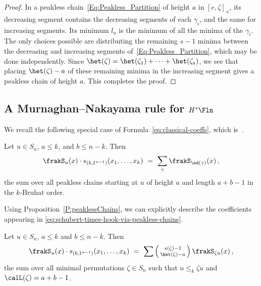 \begin{proof}
In a peakless chain~\eqref{Eq:Peakless_Partition} of height $a$ in $[e,\zeta]_\preceq$, its decreasing segment contains
the decreasing segments of each $\gamma_i$, and the same for increasing segments.
Its minimum $l_a$ is the minimum of all the minima of the $\gamma_i$.
The only choices possible are distributing the remaining $s{-}1$ minima between the decreasing and increasing segments
of~\eqref{Eq:Peakless_Partition}, which may be done independently.
Since $\het(\zeta)=\het(\zeta_1)+\dotsb+\het(\zeta_s)$, we see that placing $\het(\zeta)-a$ of these remaining minima in
the increasing segment gives a peakless chain of height $a$.
This completes the proof.
\end{proof}

\subsection{A Murnaghan--Nakayama rule for \texorpdfstring{$H^*\Fln$}{H*Fln}}

We recall the following special case of
Formula~\eqref{eq:classical-coeffs}, which is~\cite[Cor. 9]{So96}.


\begin{proposition}
    \label{pieri-formulas-version-2}
    Let $u \in S_n$,  $a\leq k$, and $b\leq n{-}k$. Then
    \begin{equation}
        \label{eq:schubert-times-hook-via-peakless-chains}
        \frakS_u(x)\cdot s_{(b,1^{a-1})}(x_1,\dotsc,x_k)\ =\ \sum_\gamma \frakS_{\nd(\gamma)}(x)\,,
    \end{equation}
    the sum over all peakless chains starting at $u$ of height $a$ and length $a{+}b{-}1$ in the $k$-Bruhat order.
\end{proposition}

Using Proposition~\ref{P:peaklessChains}, we can explicitly describe the coefficients
appearing in \eqref{eq:schubert-times-hook-via-peakless-chains}.

\begin{proposition}\label{P:classical_hook}
    Let $u \in S_n$, $a\leq k$ and $b\leq n{-}k$.
    Then
    \begin{equation}
        \label{Eq:Schubert-times-hook}
        \frakS_u(x) \cdot s_{(b, 1^{a-1})}(x_1,\dotsc,x_k)\ =\
        \sum
        \left(\begin{smallmatrix} s(\zeta)-1 \\ \het(\zeta)-a \end{smallmatrix}\right)
        \frakS_{\zeta u}(x) \,,
    \end{equation}
    the sum over all minimal permutations $\zeta \in S_n$ such that
    $u\leq_k\zeta u$ and $\calL(\zeta)=a+b-1$.
\end{proposition}

